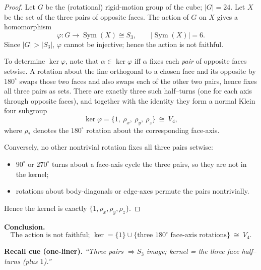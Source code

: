 \documentclass[12pt]{article}
\theoremstyle{definition}
\newcommand{\Sym}{\operatorname{Sym}}
\begin{document}
\begin{proof}
Let $G$ be the (rotational) rigid-motion group of the cube; $|G|=24$. Let $X$ be the set of the
three pairs of opposite faces. The action of $G$ on $X$ gives a homomorphism
\[
\varphi:G\longrightarrow \Sym(X)\cong S_3,\qquad |\Sym(X)|=6.
\]
Since $|G|>|S_3|$, $\varphi$ cannot be injective; hence the action is not faithful.

To determine $\ker\varphi$, note that $\alpha\in\ker\varphi$ iff $\alpha$ fixes each \emph{pair} of opposite faces setwise.
A rotation about the line orthogonal to a chosen face and its opposite by $180^\circ$ swaps those two faces and also swaps each
of the other two pairs, hence fixes all three pairs as sets. There are exactly three such half–turns (one for each axis through opposite faces),
and together with the identity they form a normal Klein four subgroup
\[
\ker\varphi=\{1,\ \rho_x,\ \rho_y,\ \rho_z\}\ \cong\ V_4,
\]
where $\rho_\ast$ denotes the $180^\circ$ rotation about the corresponding face-axis.

Conversely, no other nontrivial rotation fixes all three pairs setwise:
\begin{itemize}
\item $90^\circ$ or $270^\circ$ turns about a face-axis cycle the three pairs, so they are not in the kernel;
\item rotations about body-diagonals or edge-axes permute the pairs nontrivially.
\end{itemize}
Hence the kernel is exactly $\{1,\rho_x,\rho_y,\rho_z\}$.
\end{proof}

\noindent\textbf{Conclusion.}
\[
\boxed{\ \text{The action is not faithful; }\ker=\{1\}\cup\{\text{three }180^\circ\text{ face-axis rotations}\}\ \cong\ V_4.\ }
\]

\medskip
\noindent\textbf{Recall cue (one-liner).} \emph{“Three pairs $\Rightarrow S_3$ image; kernel = the three face half–turns (plus $1$).”}

\newpage
\end{document}
